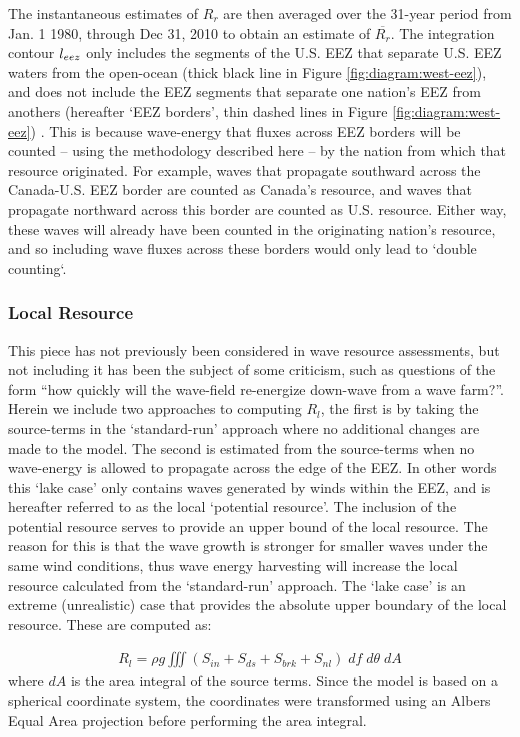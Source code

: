 The instantaneous estimates of $R_r$ are then averaged over the 31-year period from Jan. 1 1980, through Dec 31, 2010 to obtain an estimate of $\overline{R_r}$.
The integration contour $l_{eez}$ only includes the segments of the U.S. EEZ that separate U.S. EEZ waters from the open-ocean (thick black line in Figure \ref{fig:diagram:west-eez}), and does not include the EEZ segments that separate one nation's EEZ from anothers (hereafter `EEZ borders', thin dashed lines in Figure \ref{fig:diagram:west-eez}) \citep[]{flandersmarineinstituteMaritimeBoundariesGeodatabase2018}. This is because wave-energy that fluxes across EEZ borders will be counted -- using the methodology described here -- by the nation from which that resource originated. For example, waves that propagate southward across the Canada-U.S. EEZ border are counted as Canada's resource, and waves that propagate northward across this border are counted as U.S. resource. Either way, these waves will already have been counted in the originating nation's resource, and so including wave fluxes across these borders would only lead to `double counting`.

\subsubsection{Local Resource} \label{sec:method:calc:local}

This piece has not previously been considered in wave resource assessments, but not including it has been the subject of some criticism, such as questions of the form ``how quickly will the wave-field re-energize down-wave from a wave farm?''.
Herein we include two approaches to computing $R_l$, the first is by taking the source-terms in the `standard-run' approach where no additional changes are made to the model. The second is estimated from the source-terms when no wave-energy is allowed to propagate across the edge of the EEZ. In other words this `lake case' only contains waves generated by winds within the EEZ, and is hereafter referred to as the local `potential resource'. The inclusion of the potential resource serves to provide an upper bound of the local resource. The reason for this is that the wave growth is stronger for smaller waves under the same wind conditions, thus wave energy harvesting will increase the local resource calculated from the `standard-run' approach. The `lake case' is an extreme (unrealistic) case that provides the absolute upper boundary of the local resource. These are computed as:

\begin{align}
  R_{l} = \rho g \iiint \left(S_{in} + S_{ds} + S_{brk} + S_{nl} \right) \; df \; d\theta \; dA
\end{align}
where $dA$ is the area integral of the source terms. Since the model is based on a spherical coordinate system, the coordinates were transformed using an Albers Equal Area projection before performing the area integral. 

